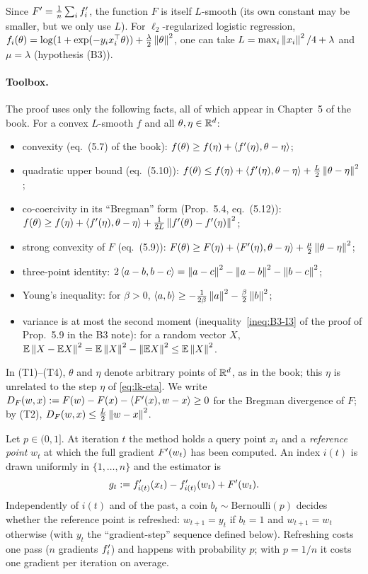 Since $F'=\frac1n\sum_i f'_i$, the function $F$ is itself $L$-smooth (its own constant may be smaller, but we only use $L$). For $\ell_2$-regularized logistic regression, $f_i(\theta)=\log(1+\exp(-y_i x_i^\top\theta))+\frac{\lambda}{2}\left\|\theta\right\|^2$, one can take $L=\max_i\left\|x_i\right\|^2/4+\lambda$ and $\mu=\lambda$ (hypothesis (B3)).

\paragraph{Toolbox.} The proof uses only the following facts, all of which appear in Chapter~5 of the book. For a convex $L$-smooth $f$ and all $\theta,\eta\in\mathbb{R}^d$:
\begin{itemize}
\item[(T1)] convexity (eq.~(5.7) of the book): $f(\theta)\ge f(\eta)+\left\langle f'(\eta), \theta-\eta \right\rangle$;
\item[(T2)] quadratic upper bound (eq.~(5.10)): $f(\theta)\le f(\eta)+\left\langle f'(\eta), \theta-\eta \right\rangle+\frac L2\left\|\theta-\eta\right\|^2$;
\item[(T3)] co-coercivity in its ``Bregman'' form (Prop.~5.4, eq.~(5.12)): $f(\theta)\ge f(\eta)+\left\langle f'(\eta), \theta-\eta \right\rangle+\frac1{2L}\left\|f'(\theta)-f'(\eta)\right\|^2$;
\item[(T4)] strong convexity of $F$ (eq.~(5.9)): $F(\theta)\ge F(\eta)+\left\langle F'(\eta), \theta-\eta \right\rangle+\frac\mu2\left\|\theta-\eta\right\|^2$;
\item[(T5)] three-point identity: $2\left\langle a-b, b-c \right\rangle=\left\|a-c\right\|^2-\left\|a-b\right\|^2-\left\|b-c\right\|^2$;
\item[(T6)] Young's inequality: for $\beta>0$, $\left\langle a, b \right\rangle\ge-\frac1{2\beta}\left\|a\right\|^2-\frac\beta2\left\|b\right\|^2$;
\item[(T7)] variance is at most the second moment (inequality~\eqref{ineq:B3-I3} of the proof of Prop.~5.9 in the B3 note): for a random vector $X$, $\mathbb{E}\left\|X-\mathbb{E} X\right\|^2=\mathbb{E}\left\|X\right\|^2-\left\|\mathbb{E} X\right\|^2\le\mathbb{E}\left\|X\right\|^2$.
\end{itemize}
In (T1)--(T4), $\theta$ and $\eta$ denote arbitrary points of $\mathbb{R}^d$, as in the book; this $\eta$ is unrelated to the step $\eta$ of \eqref{eq:lk-eta}. We write $D_F(w,x):=F(w)-F(x)-\left\langle F'(x), w-x \right\rangle\ge 0$ for the Bregman divergence of $F$; by (T2), $D_F(w,x)\le\frac L2\left\|w-x\right\|^2$.

\begin{definition}\label{def:lsvrg}
Let $p\in(0,1]$. At iteration $t$ the method holds a query point $x_t$ and a \emph{reference point} $w_t$ at which the full gradient $F'(w_t)$ has been computed. An index $i(t)$ is drawn uniformly in $\{1,\dots,n\}$ and the estimator is
\begin{equation}\label{eq:lk-estimator}
g_t := f'_{i(t)}(x_t) - f'_{i(t)}(w_t) + F'(w_t).
\end{equation}
Independently of $i(t)$ and of the past, a coin $b_t\sim\mathrm{Bernoulli}(p)$ decides whether the reference point is refreshed: $w_{t+1}=y_t$ if $b_t=1$ and $w_{t+1}=w_t$ otherwise (with $y_t$ the ``gradient-step'' sequence defined below). Refreshing costs one pass ($n$ gradients $f'_i$) and happens with probability $p$; with $p=1/n$ it costs one gradient per iteration on average.
\end{definition}

